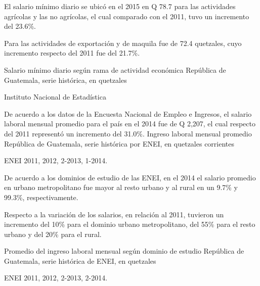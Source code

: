 
{%
El salario mínimo diario se ubicó en el 2015 en Q 78.7 para las actividades agrícolas y las no agrícolas, el cual comparado con el 2011, tuvo un incremento del 23.6\%. 

Para las actividades de exportación y de maquila fue de 72.4 quetzales, cuyo incremento respecto del 2011 fue del 21.7\%. 

}%
{%
 Salario mínimo diario según rama de actividad económica} %
{%
 República de Guatemala, serie histórica, en quetzales } %
{%
 \begin{tikzpicture}[x=1pt,y=1pt]    \end{tikzpicture}}%
{%
 Instituto Nacional de Estadística} %



%
{%
De acuerdo a los datos de la Encuesta Nacional de Empleo e Ingresos, el salario laboral mensual promedio para el país en el 2014 fue de Q 2,207, el cual respecto del 2011 representó un incremento del 31.0\%. }%
{%
	Ingreso laboral mensual promedio} %
{%
	República de Guatemala, serie histórica por ENEI, en quetzales corrientes} %
{%
	\begin{tikzpicture}[x=1pt,y=1pt]    \end{tikzpicture}}%
{%
	ENEI 2011, 2012, 2-2013, 1-2014.} %



%
{%
De acuerdo a los dominios de estudio de las ENEI, en el 2014 el salario promedio en urbano metropolitano fue mayor al resto urbano y al rural en un 9.7\%  y 99.3\%, respectivamente.

Respecto a la variación de los salarios, en relación al 2011, tuvieron un incremento del 10\% para el dominio urbano metropolitano, del 55\% para el resto urbano y del 20\% para el rural.}%
{%
	Promedio del ingreso laboral mensual según dominio de estudio} %
{%
	República de Guatemala, serie histórica de ENEI, en quetzales } %
{%
	\begin{tikzpicture}[x=1pt,y=1pt]    \end{tikzpicture}}%
{%
			ENEI 2011, 2012, 2-2013, 2-2014.} %


